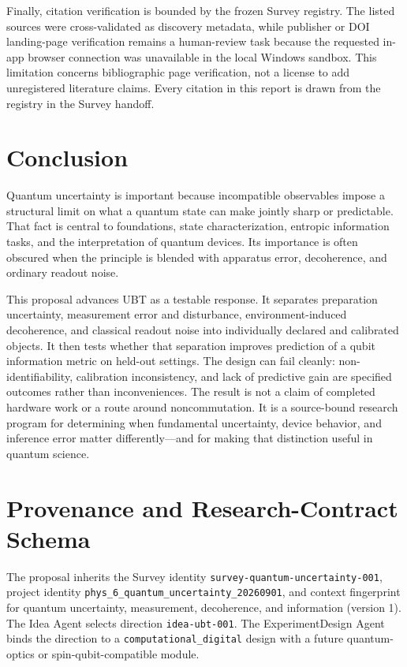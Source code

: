 \documentclass[conference]{../../../../Conference-LaTeX-template_10-17-19/IEEEtran}
\begin{document}
Finally, citation verification is bounded by the frozen Survey registry. The listed sources were cross-validated as discovery metadata, while publisher or DOI landing-page verification remains a human-review task because the requested in-app browser connection was unavailable in the local Windows sandbox. This limitation concerns bibliographic page verification, not a license to add unregistered literature claims. Every citation in this report is drawn from the registry in the Survey handoff.

\section{Conclusion}

Quantum uncertainty is important because incompatible observables impose a structural limit on what a quantum state can make jointly sharp or predictable. That fact is central to foundations, state characterization, entropic information tasks, and the interpretation of quantum devices. Its importance is often obscured when the principle is blended with apparatus error, decoherence, and ordinary readout noise.

This proposal advances UBT as a testable response. It separates preparation uncertainty, measurement error and disturbance, environment-induced decoherence, and classical readout noise into individually declared and calibrated objects. It then tests whether that separation improves prediction of a qubit information metric on held-out settings. The design can fail cleanly: non-identifiability, calibration inconsistency, and lack of predictive gain are specified outcomes rather than inconveniences. The result is not a claim of completed hardware work or a route around noncommutation. It is a source-bound research program for determining when fundamental uncertainty, device behavior, and inference error matter differently---and for making that distinction useful in quantum science.

\appendices
\section{Provenance and Research-Contract Schema}

The proposal inherits the Survey identity \texttt{survey-quantum-uncertainty-001}, project identity \texttt{phys\_6\_quantum\_uncertainty\_20260901}, and context fingerprint for quantum uncertainty, measurement, decoherence, and information (version 1). The Idea Agent selects direction \texttt{idea-ubt-001}. The ExperimentDesign Agent binds the direction to a \texttt{computational\_digital} design with a future quantum-optics or spin-qubit-compatible module.
\end{document}
